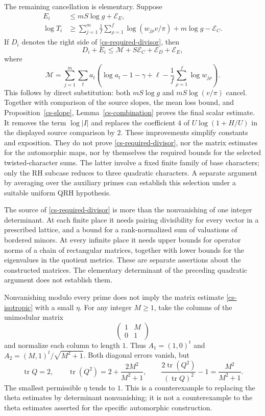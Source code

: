The remaining cancellation is elementary. Suppose
\begin{align*}
 E_i&\le mS\log g+\mathcal E_E,\\
 \log T_i&\ge
   \sum_{j=1}^m\frac1f\sum_{\rho=1}^f\log(w_{j\rho}v/\pi)
       +m\log g-\mathcal E_C.
\end{align*}
If $D_i$ denotes the right side of \eqref{cs-required-divisor}, then
\[
 D_i+E_i\le\mathcal M+S\mathcal E_C+\mathcal E_D+\mathcal E_E,
\]
where
\[
 \mathcal M=\sum_{j=1}^m\sum_t
 a_t\left(\log a_t-1-\gamma+\ell
                   -\frac1f\sum_{\rho=1}^f\log w_{j\rho}\right).
\]
This follows by direct substitution: both $mS\log g$ and
$mS\log(v/\pi)$ cancel. Together with comparison of the source slopes,
the mean loss bound, and Proposition~\ref{cs-slope},
Lemma~\ref{cs-combination} proves the final scalar estimate. It removes
the term $\log|I|$ and replaces the coefficient $4$ of
$U\log(1+H/U)$ in the displayed source comparison by $2$.
These improvements simplify constants and exposition. They do not
prove \eqref{cs-required-divisor}, nor the matrix estimates for the
automorphic maps, nor by themselves the required bounds for the selected
twisted-character sums.  The latter involve a fixed finite family of
base characters; only the RH subcase reduces to three quadratic
characters.  A separate argument by averaging over the auxiliary primes
can establish this selection under a suitable uniform QRH hypothesis.

The source of \eqref{cs-required-divisor} is more than the
nonvanishing of one integer determinant. At each finite place it needs
pairing divisibility for every vector in a prescribed lattice, and a
bound for a rank-normalized sum of valuations of bordered minors.
At every infinite place it needs upper bounds for operator norms of a
chain of rectangular matrices, together with lower bounds for the
eigenvalues in the quotient metrics. These are separate assertions
about the constructed matrices. The elementary determinant of the
preceding quadratic argument does not establish them.

\begin{remark}\label{cs-counterexample}
Nonvanishing modulo every prime does not imply the matrix estimate
\eqref{cs-isotropic} with a small $\eta$. For any integer $M\ge1$, take
the columns of the unimodular matrix
\[
 \begin{pmatrix}1&M\\0&1\end{pmatrix}
\]
and normalize each column to length $1$. Thus
$A_1=(1,0)^t$ and $A_2=(M,1)^t/\sqrt{M^2+1}$.
Both diagonal errors vanish, but
\[
 \operatorname{tr}Q=2,\qquad
 \operatorname{tr}(Q^2)=2+\frac{2M^2}{M^2+1},\qquad
 \frac{2\operatorname{tr}(Q^2)}{(\operatorname{tr}Q)^2}-1
       =\frac{M^2}{M^2+1}.
\]
The smallest permissible $\eta$ tends to $1$. This is a counterexample
to replacing the theta estimates by determinant nonvanishing; it is
not a counterexample to the theta estimates asserted for the specific
automorphic construction.
\end{remark}

